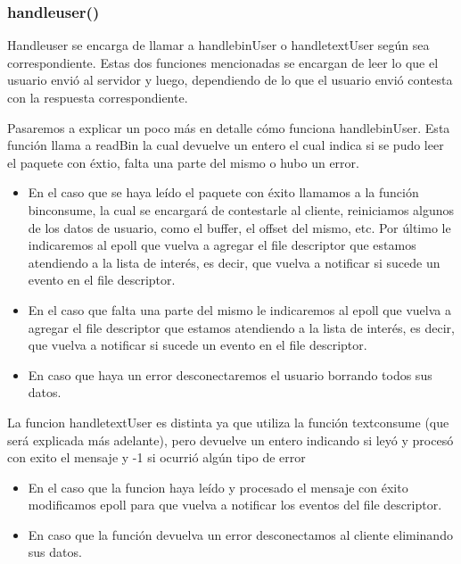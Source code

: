 \documentclass{article}
\begin{document}
\subsubsection{handle\textunderscore user()}
Handle\textunderscore user se encarga de llamar a
handle\textunderscore binUser o 
handle\textunderscore textUser según sea correspondiente.
Estas dos funciones mencionadas se encargan de leer
lo que el usuario envió al servidor y luego, dependiendo
de lo que el usuario envió contesta con la respuesta
correspondiente.

Pasaremos a explicar un poco más en detalle cómo funciona
handle\textunderscore binUser. Esta función llama a readBin
la cual devuelve un entero el cual indica si se pudo leer
el paquete con éxtio, falta una parte del mismo o hubo un
error. 
\begin{itemize}
\item En el caso que se haya leído el paquete con éxito
llamamos a la función bin\textunderscore consume, la cual se 
encargará de contestarle al cliente, reiniciamos algunos
de los datos de usuario, como el buffer, el offset del mismo, etc.
Por último le indicaremos al epoll que vuelva a agregar el file descriptor
que estamos atendiendo a la lista de interés, es decir, que
vuelva a notificar si sucede un evento en el file descriptor.
\item En el caso que falta una parte del mismo le indicaremos al epoll que vuelva a agregar el file descriptor
que estamos atendiendo a la lista de interés, es decir, que
vuelva a notificar si sucede un evento en el file descriptor.
\item En caso que haya un error desconectaremos el usuario
borrando todos sus datos.
\end{itemize}

La funcion handle\textunderscore textUser es distinta ya 
que utiliza la función text\textunderscore consume (que será
explicada más adelante), pero devuelve un entero indicando
si leyó y procesó con exito el mensaje y -1 si ocurrió algún
tipo de error
\begin{itemize}
\item En el caso que la funcion haya leído y procesado
el mensaje con éxito modificamos epoll para que vuelva a
notificar los eventos del file descriptor.
\item En caso que la función devuelva un error desconectamos
al cliente eliminando sus datos.
\end{itemize}
\end{document}
